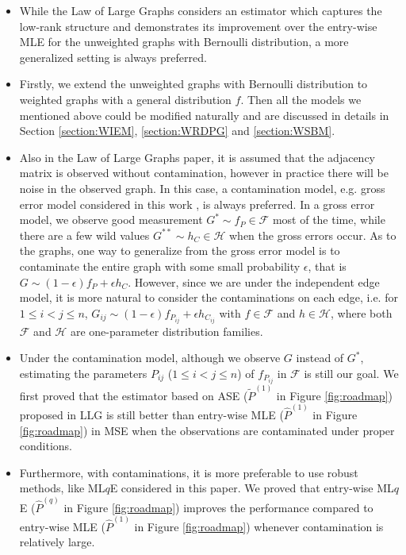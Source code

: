 \documentclass[a4paper]{article}
\renewcommand{\hat}{\widehat}
\begin{document}
\begin{itemize}
\item While the Law of Large Graphs considers an estimator which captures the low-rank structure and demonstrates its improvement over the entry-wise MLE for the unweighted graphs with Bernoulli distribution, a more generalized setting is always preferred.

\item Firstly, we extend the unweighted graphs with Bernoulli distribution to weighted graphs with a general distribution $f$. Then all the models we mentioned above could be modified naturally and are discussed in details in Section \ref{section:WIEM}, \ref{section:WRDPG} and \ref{section:WSBM}.

\item Also in the Law of Large Graphs paper, it is assumed that the adjacency matrix is observed without contamination, however in practice there will be noise in the observed graph. In this case, a contamination model, e.g. gross error model considered in this work \cite{AIC:AIC690280519, bickel2001mathematical}, is always preferred. In a gross error model, we observe good measurement $G^* \sim f_P \in \mathcal{F}$ most of the time, while there are a few wild values $G^{**} \sim h_C \in \mathcal{H}$ when the gross errors occur.
As to the graphs, one way to generalize from the gross error model is to contaminate the entire graph with some small probability $\epsilon$, that is $G \sim (1-\epsilon) f_P + \epsilon h_C$. However, since we are under the independent edge model, it is more natural to consider the contaminations on each edge, i.e. for $1 \le i < j \le n$, $G_{ij} \sim (1-\epsilon) f_{P_{ij}} + \epsilon h_{C_{ij}}$ with $f \in \mathcal{F}$ and $h \in \mathcal{H}$, where both $\mathcal{F}$ and $\mathcal{H}$ are one-parameter distribution families.

\item Under the contamination model, although we observe $G$ instead of $G^*$, estimating the parameters $P_{ij}$ ($1 \le i < j \le n$) of $f_{P_{ij}}$ in $\mathcal{F}$ is still our goal. We first proved that the estimator based on ASE ($\widetilde{P}^{(1)}$ in Figure \ref{fig:roadmap}) proposed in LLG is still better than entry-wise MLE ($\hat{P}^{(1)}$ in Figure \ref{fig:roadmap}) in MSE when the observations are contaminated under proper conditions.

\item Furthermore, with contaminations, it is more preferable to use robust methods, like ML$q$E \cite{ferrari2010, qin2013maximum} considered in this paper. We proved that entry-wise ML$q$E ($\hat{P}^{(q)}$ in Figure \ref{fig:roadmap}) improves the performance compared to entry-wise MLE ($\hat{P}^{(1)}$ in Figure \ref{fig:roadmap}) whenever contamination is relatively large.


\end{itemize}
\end{document}
